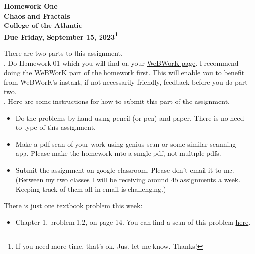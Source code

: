 \documentclass[12pt]{article}
\begin{document}
\pagestyle{empty}
 
\begin{center}
{\LARGE {\bf Homework One}}\\
\bigskip
{\Large {\bf Chaos and Fractals}}\\
\bigskip
{\Large {\bf College of the Atlantic}}\\
\bigskip
{ {\bf Due Friday, September 15, 2023\footnote{If you need more time,
      that's ok. Just let me know. Thanks!}}}\\  
\end{center}
\medskip


\noindent There are two parts to this assignment.\\

.  Do Homework 01 which you will find
on your
\href{https://webwork-hosting.runestone.academy/webwork2/coa-feldman-es1026i-fall2023}{WeBWorK
  page}.  I recommend doing the WeBWorK part of the 
homework first.  This will enable you to benefit from WeBWorK's
instant, if not necessarily friendly, feedback before you do part two.\\

.  Here are some
instructions for how to submit this part of the assignment.
\begin{itemize}
\item Do the problems by hand using pencil (or pen) and paper.
  There is no need to type of this assignment.
\item Make a pdf scan of your work using genius scan or some
  similar scanning app.  Please make the homework into a single
  pdf, not multiple pdfs.
\item Submit the assignment on google classroom.  Please don't
  email it to me.  (Between my two classes I will be receiving
  around 45 assignments a week.  Keeping track of them all in email
  is challenging.)
\end{itemize}

\noindent There is just one textbook problem this week:

\begin{itemize}
\setlength{\itemsep}{-1mm}
\item Chapter 1, problem 1.2, on page 14.  You can find a scan of
  this problem \href{http://hornacek.coa.edu/dave/Teaching/Chaos+Fractals.F23/pdf/page_14.pdf}{here}.
\end{itemize}
\end{document}
